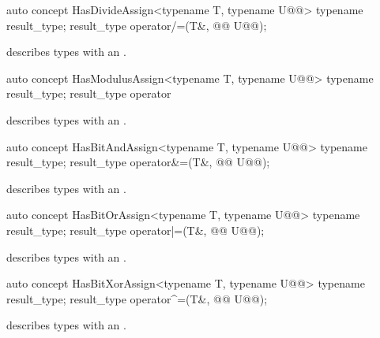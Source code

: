 \documentclass[american,twoside]{book}
\begin{document}
\begin{itemdecl}
auto concept HasDivideAssign<typename T, typename U@@> {
  typename result_type;
  result_type operator/=(T&, @@ U@\removedCCC{\&}@);
}
\end{itemdecl}

\begin{itemdescr}
\pnum
\mbox{\reallynote} describes types with an \mbox{}.
\end{itemdescr}

\begin{itemdecl}
auto concept HasModulusAssign<typename T, typename U@@> {
  typename result_type;
  result_type operator%
}
\end{itemdecl}

\begin{itemdescr}
\pnum
\mbox{\reallynote} describes types with an \mbox{}.
\end{itemdescr}

\begin{itemdecl}
auto concept HasBitAndAssign<typename T, typename U@@> {
  typename result_type;
  result_type operator&=(T&, @@ U@\removedCCC{\&}@);
}
\end{itemdecl}

\begin{itemdescr}
\pnum
\mbox{\reallynote} describes types with an \mbox{}.
\end{itemdescr}

\begin{itemdecl}
auto concept HasBitOrAssign<typename T, typename U@@> {
  typename result_type;
  result_type operator|=(T&, @@ U@\removedCCC{\&}@);
}
\end{itemdecl}

\begin{itemdescr}
\pnum
\mbox{\reallynote} describes types with an \mbox{}.
\end{itemdescr}

\begin{itemdecl}
auto concept HasBitXorAssign<typename T, typename U@@> {
  typename result_type;
  result_type operator^=(T&, @@ U@\removedCCC{\&}@);
}
\end{itemdecl}

\begin{itemdescr}
\pnum
\mbox{\reallynote} describes types with an \mbox{}.
\end{itemdescr}
\end{document}
